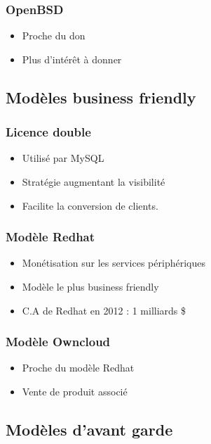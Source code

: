 \begin{frame}
\frametitle{OpenBSD}

\begin{itemize}
    \itemsep1.5em
    \item Proche du don
    \item Plus d'intérêt à donner
\end{itemize}
\end{frame}

    \subsection{Modèles business friendly}

\begin{frame}
\frametitle{Licence double}

\begin{itemize}
    \itemsep1.5em
    \item Utilisé par MySQL
    \item Stratégie augmentant la visibilité
    \item Facilite la conversion de clients.
\end{itemize}
\end{frame}


\begin{frame}   %
\frametitle{Modèle Redhat}

\begin{itemize}
    \itemsep1.5em
    \item Monétisation sur les services périphériques
    \item Modèle le plus business friendly
    \item C.A de Redhat en 2012 : 1 milliards \${}
\end{itemize}
\end{frame}


\begin{frame}
\frametitle{Modèle Owncloud}

\begin{itemize}
    \itemsep1.5em
    \item Proche du modèle Redhat
    \item Vente de produit associé
\end{itemize}
\end{frame}


    \subsection{Modèles d'avant garde}


